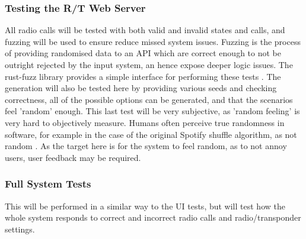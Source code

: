 \subsubsection{Testing the R/T Web Server}
All radio calls will be tested with both valid and invalid states and calls, and fuzzing will be used to ensure reduce missed system issues. Fuzzing is the process of providing randomised data to an API which are correct enough to not be outright rejected by the input system, an hence expose deeper logic issues. The rust-fuzz library provides a simple interface for performing these tests \cite{rust-fuzz}. The generation will also be tested here by providing various seeds and checking correctness, all of the possible options can be generated, and that the scenarios feel 'random' enough. This last test will be very subjective, as 'random feeling' is very hard to objectively measure. Humans often perceive true randomness in software, for example in the case of the original Spotify shuffle algorithm, as not random \cite{spotify-shuffle}. As the target here is for the system to feel random, as to not annoy users, user feedback may be required.

\subsubsection{Full System Tests}
This will be performed in a similar way to the UI tests, but will test how the whole system responds to correct and incorrect radio calls and radio/transponder settings. 